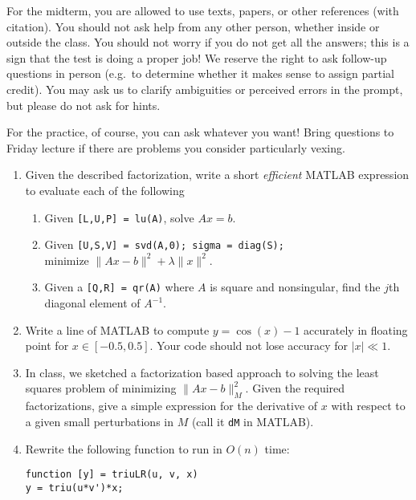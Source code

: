 \documentclass[12pt, leqno]{article}
\begin{document}

For the midterm, you are allowed to use texts, papers, or other
references (with citation).  You should not ask help from any other
person, whether inside or outside the class.  You should not worry if
you do not get all the answers; this is a sign that the test is doing
a proper job!  We reserve the right to ask follow-up questions in
person (e.g.~to determine whether it makes sense to assign partial
credit).  You may ask us to clarify ambiguities or perceived errors in
the prompt, but please do not ask for hints.

For the practice, of course, you can ask whatever you want!
Bring questions to Friday lecture if there are problems you consider
particularly vexing.

\begin{enumerate}

\item
  Given the described factorization, write a short {\em efficient}
  MATLAB expression to evaluate each of the following
  \begin{enumerate}
    
  \item Given \verb|[L,U,P] = lu(A)|, solve $Ax = b$.

  \item Given \verb|[U,S,V] = svd(A,0); sigma = diag(S);| \\
    minimize $\|Ax-b\|^2 + \lambda \|x\|^2$.

  \item Given a \verb|[Q,R] = qr(A)| where $A$ is square and
    nonsingular, find the $j$th diagonal element of $A^{-1}$.
    
  \end{enumerate}

\item
  Write a line of MATLAB to compute $y = \cos(x)-1$ accurately in floating
  point for $x \in [-0.5, 0.5]$.  Your code should not lose accuracy
  for $|x| \ll 1$.

\item
  In class, we sketched a factorization based approach to solving the
  least squares problem of minimizing $\|Ax-b\|_M^2$.  Given the
  required factorizations, give a simple expression for the derivative
  of $x$ with respect to a given small perturbations in $M$ (call it
  {\tt dM} in MATLAB).

\item
  Rewrite the following function to run in $O(n)$ time:
\begin{verbatim}
function [y] = triuLR(u, v, x)
y = triu(u*v')*x;
\end{verbatim}


\end{enumerate}
\end{document}
